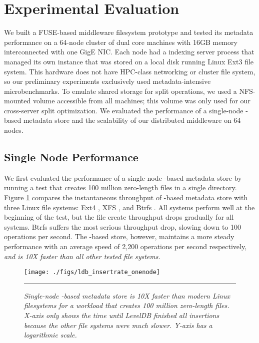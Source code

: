 \section{Experimental Evaluation}

We built a FUSE-based middleware filesystem prototype and tested its metadata
performance on a
64-node cluster of dual core machines with 16GB memory interconnected with one
GigE NIC.
Each node had a \giga{} indexing server process that managed its own \ldb instance
that was stored on a local disk running Linux Ext3 file system.
This hardware does not have HPC-class networking or cluster file system, so our
preliminary experiments exclusively used metadata-intensive microbenchmarks.
To emulate shared storage for split operations, we used a NFS-mounted
volume accessible from all machines; this volume was only used for
our cross-server \ldb split optimization.
We evaluated the performance of a single-node \ldb-based metadata store and
the scalability of our distributed middleware on 64 nodes.

\subsection{Single Node Performance}
We first evaluated the performance of a single-node \ldb-based metadata store
by running a test that creates 100 million zero-length files in a single
directory.
Figure \ref{graph:ldb-singlenode} compares the instantaneous throughput of \ldb-based metadata 
store with three Linux file systems: Ext4 \cite{Ext4}, XFS \cite{XFS}, and
Btrfs \cite{BTRFS}.
All systems perform well at the beginning of the test, but the file create
throughput drops gradually for all systems.
Btrfs suffers the most serious throughput drop, slowing down to 100 operations
per second.
The \ldb-based store, however, maintains a more steady performance
with an average speed of 2,200 operations per second respectively,
\textit{and is 10X faster than all other tested file systems.}

\begin{figure}[t]  %
\centerline{\texttt{[image: ./figs/ldb\_insertrate\_onenode]}}
\vspace{10pt}
\caption{\normalsize
\textit{Single-node \ldb{}-based metadata store is 10X faster than modern Linux
filesystems for a workload that creates 100 million zero-length files.
X-axis only shows the time until LevelDB finished all insertions because the other
file systems were much slower. Y-axis has a logarithmic scale.}
}
\vspace{10pt}
\hrule
\label{graph:ldb-singlenode}
\end{figure}       %

